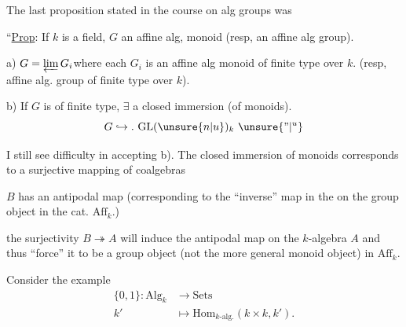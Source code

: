 The last proposition stated in the course on alg groups was\unsure{\textsuperscript{-}|\textsuperscript{,}}

``\uline{Prop}: If $k$ is a field, $G$ an affine alg, monoid (resp, an affine alg group).

a) $G=\varprojlim G_i$\qquad where each $G_i$ is an affine alg monoid of finite type over $k$. (resp, affine alg. group of finite type over $k$).

b) If $G$ is of finite type, $\exists$ a closed immersion (of monoids).
\[
G\hookrightarrow.\ \mathrm{GL}(\unsure{n|u})_k\ \unsure{\text{''}|{}^{u}}
\]

I still see difficulty in accepting b). The closed immersion of monoids corresponds to a surjective mapping of coalgebras

$B$ has an antipodal map (corresponding to the ``inverse'' map in the on the group object in the cat. $\mathrm{Aff}_k$.)
\clearpage


the surjectivity $B\twoheadrightarrow A$ will induce the antipodal map on the $k$-algebra $A$ and thus ``force'' it to be a group object (not the more general monoid object) in $\mathrm{Aff}_k$.

Consider the example
\[
\begin{aligned}
\{0,1\}: \mathrm{Alg}_k&\longrightarrow\mathrm{Sets}\\
k'&\longmapsto\mathrm{Hom}_{k\text{-alg}.}(k\times k,k').
\end{aligned}
\]

